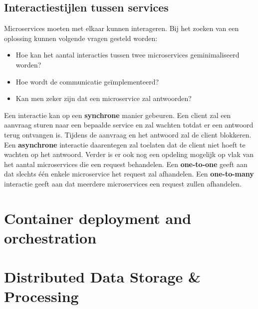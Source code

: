 \documentclass{report}
\begin{document}
	\chapter{Interactiestijlen tussen services}
	Microservices moeten met elkaar kunnen interageren. Bij het zoeken van een oplossing kunnen volgende vragen gesteld worden:
	\begin{itemize}
		\item Hoe kan het aantal interacties tussen twee microservices geminimaliseerd worden?
		\item Hoe wordt de communicatie geïmplementeerd?
		\item Kan men zeker zijn dat een microservice zal antwoorden?
	\end{itemize}
	Een interactie kan op een \textbf{synchrone} manier gebeuren. Een client zal een aanvraag sturen naar een bepaalde service en zal wachten totdat er een antwoord terug ontvangen is. Tijdens de aanvraag en het antwoord zal de client blokkeren. Een \textbf{asynchrone} interactie daarentegen zal toelaten dat de client niet hoeft te wachten op het antwoord. Verder is er ook nog een opdeling mogelijk op vlak van het aantal microservices die een request behandelen. Een \textbf{one-to-one} geeft aan dat slechts één enkele microservice het request zal afhandelen. Een \textbf{one-to-many} interactie geeft aan dat meerdere microservices een request zullen afhandelen.
	
	\part{Container deployment and orchestration}
	
	\part{Distributed Data Storage \& Processing}
\end{document}
